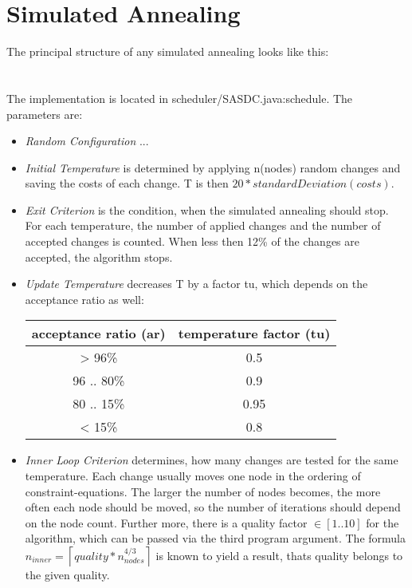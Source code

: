 \documentclass[colorback,accentcolor=tud1c,11pt]{tudreport}
\begin{document}
  \chapter{Simulated Annealing}
  The principal structure of any simulated annealing looks like this:\\
  \\ \\
  The implementation is located in scheduler/SASDC.java:schedule. The parameters are:
  \begin{itemize}
  	\item \emph{Random Configuration} ...
  	\item \emph{Initial Temperature} is determined by applying n(nodes) random changes and saving the costs of each change. T is then $20 * standardDeviation(costs)$.
  	\item \emph{Exit Criterion} is the condition, when the simulated annealing should stop. For each temperature, the number of applied changes and the number of accepted changes is counted. When less then 12\% of the changes are accepted, the algorithm stops.
  	\item \emph{Update Temperature} decreases T by a factor tu, which depends on the acceptance ratio as well:
  	\begin{tabular}{ c | c }
  		acceptance ratio (ar) & temperature factor (tu) \\
  		\hline
  		> 96\% & 0.5 \\
  		96 .. 80\% & 0.9 \\
  		80 .. 15\% & 0.95 \\
  		< 15\% & 0.8 \\
  	\end{tabular}
    \item \emph{Inner Loop Criterion} determines, how many changes are tested for the same temperature. Each change usually moves one node in the ordering of constraint-equations. The larger the number of nodes becomes, the more often each node should be moved, so the number of iterations should depend on the node count. Further more, there is a quality factor $\in [1 .. 10]$ for the algorithm, which can be passed via the third program argument. The formula $n_{inner} = \left\lceil quality * n_{nodes}^{4/3} \right\rceil$ is known to yield a result, thats quality belongs to the given quality.
  \end{itemize}
\end{document}
